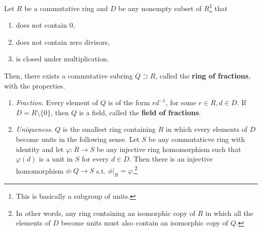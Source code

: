   \begin{definition}
    Let $R$ be a commutative ring and $D$ be any nonempty subset of $R$\footnote{This is basically a subgroup of units.} that 
    \begin{enumerate}
      \item does not contain $0$, 
      \item does not contain zero divisors, 
      \item is closed under multiplication. 
    \end{enumerate}
    Then, there exists a commutative subring $Q \supset R$, called the \textbf{ring of fractions}, with the properties. 
    \begin{enumerate}
      \item \textit{Fraction}. Every element of $Q$ is of the form $r d^{-1}$, for some $r \in R, d \in D$. If $D = R \setminus \{0\}$, then $Q$ is a field, called the \textbf{field of fractions}. 
      \item \textit{Uniqueness}. $Q$ is the smallest ring containing $R$ in which every elements of $D$ become units in the following sense. Let $S$ be any commutaticve ring with identity and let $\varphi: R \to S$ be any injective ring homomorphism such that $\varphi(d)$ is a unit in $S$ for every $d \in D$. Then there is an injective homomorphism $\phi: Q \to S$ s.t. $\phi |_R = \varphi$.\footnote{In other words, any ring containing an isomorphic copy of $R$ in which all the elements of $D$ become units must also contain an isomorphic copy of $Q$.}
    \end{enumerate}
  \end{definition}
